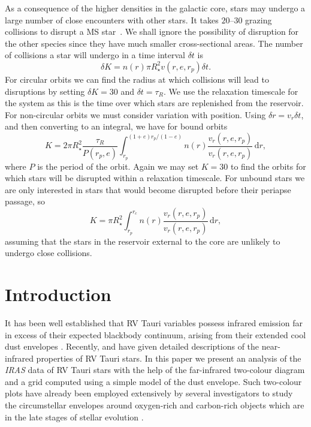 \documentclass[useAMS,usedcolumn,usegraphicx,usenatbib]{mn2e}
\newcommand{\dd}{\ensuremath{\mathrm{d}}}
\newcommand{\intd}[4]{\ensuremath{\int_{#1}^{#2}{#3}\,\dd{#4}}}
\begin{document}
As a consequence of the higher densities in the galactic core, stars may undergo a large number of close encounters with other stars. It takes $20$--$30$ grazing collisions to disrupt a MS star~\citep{Freitag2006}. We shall ignore the possibility of disruption for the other species since they have much smaller cross-sectional areas. The number of collisions a star will undergo in a time interval $\delta t$ is
\begin{equation}
\delta K = n(r) \pi R_\star^2 v(r,e,r_p)\delta t.
\end{equation}
For circular orbits we can find the radius at which collisions will lead to disruptions by setting $\delta K = 30$ and $\delta t = \tau_R$. We use the relaxation timescale for the system as this is the time over which stars are replenished from the reservoir. For non-circular orbits we must consider variation with position. Using $\delta r = v_r \delta t$, and then converting to an integral, we have for bound orbits
\begin{equation}
K = 2\pi R_\star^2 \frac{\tau_R}{P(r_p,e)}\intd{r_p}{(1+e)r_p/(1-e)}{n(r)\frac{v_r(r,e,r_p)}{v_r(r,e,r_p)}}{r},
\end{equation}
where $P$ is the period of the orbit. Again we may set $K = 30$ to find the orbits for which stars will be disrupted within a relaxation timescale. For unbound stars we are only interested in stars that would become disrupted before their periapse passage, so
\begin{equation}
K = \pi R_\star^2 \intd{r_p}{r_c}{n(r)\frac{v_r(r,e,r_p)}{v_r(r,e,r_p)}}{r},
\end{equation}
assuming that the stars in the reservoir external to the core are unlikely to undergo close collisions.

\section{Introduction}

It has been well established that RV Tauri variables  possess
infrared emission far in excess of their expected  blackbody
continuum, arising from their extended cool dust envelopes
\citep{b7,b5,b6}. Recently, \citet{b15} and \citet{b9} have given
detailed descriptions of the near-infrared properties of RV Tauri
stars. In this paper we present an analysis of the {\it IRAS\/}
data of RV Tauri stars with the help of the far-infrared
two-colour diagram and a grid computed using a simple model of the
dust envelope. Such two-colour plots have already been employed
extensively by several investigators to study the circumstellar
envelopes around oxygen-rich and carbon-rich objects which are in
the late stages of stellar evolution \citep{b10,b25,b23,b24}.
\end{document}
